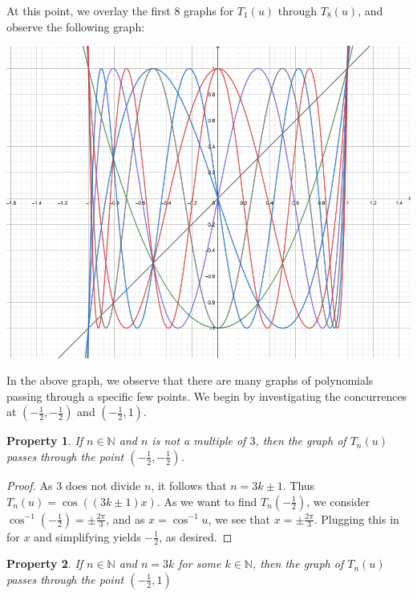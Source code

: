 \documentclass[12pt, letterpaper]{article} %
\newtheorem{theorem}{Property}
\begin{document}
At this point, we overlay the first $8$ graphs for $T_1(u)$ through $T_8(u)$, and observe the following graph:

\begin{center}
  \includegraphics[scale=.44]{pic2.png}
\end{center}

In the above graph, we observe that there are many graphs of polynomials passing through a specific few points. We begin by investigating the concurrences at $\left(-\frac{1}{2},-\frac{1}{2}\right)$ and $\left( -\frac{1}{2}, 1 \right)$.\\

\begin{theorem}
  If $n \in \mathbb{N}$ and $n$ is not a multiple of $3$, then the graph of $T_n(u)$ passes through the point $\left(-\frac{1}{2},-\frac{1}{2}\right)$.
\end{theorem}

\begin{proof}
  As $3$ does not divide $n$, it follows that $n = 3k \pm 1$. Thus $T_n(u) = \cos ((3k\pm 1)x)$. As we want to find $T_n\left( -\frac{1}{2} \right)$, we consider $\cos^{-1} \left(- \frac{1}{2} \right) = \pm \frac{2\pi}{3}$, and as $x = \cos^{-1} u$, we see that $x = \pm \frac{2\pi}{3}$. Plugging this in for $x$ and simplifying yields $-\frac{1}{2}$, as desired.
\end{proof}

\begin{theorem}
  If $n \in \mathbb{N}$ and $n = 3k$ for some $k \in \mathbb{N}$, then the graph of $T_n(u)$ passes through the point $\left( -\frac{1}{2}, 1 \right)$
\end{theorem}
\end{document}
